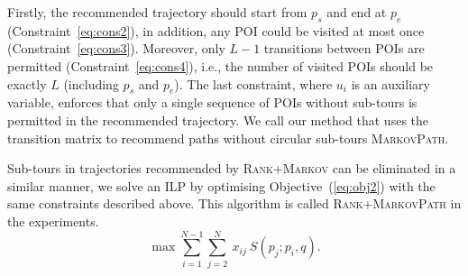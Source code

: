 Firstly, the recommended trajectory should start from $p_s$ and end at $p_e$ (Constraint~\ref{eq:cons2}),
in addition, any POI could be visited at most once (Constraint~\ref{eq:cons3}).
Moreover, only $L-1$ transitions between POIs are permitted (Constraint~\ref{eq:cons4}),
i.e., the number of visited POIs should be exactly $L$ (including $p_s$ and $p_e$).
The last constraint, where $u_i$ is an auxiliary variable, 
enforces that only a single sequence of POIs without sub-tours is permitted in the recommended trajectory.
We call our method that uses the transition matrix to recommend paths 
without circular sub-tours \textsc{MarkovPath}.


Sub-tours in trajectories recommended by \textsc{Rank+Markov} can be eliminated in a similar manner,
we solve an ILP by optimising Objective~(\ref{eq:obj2}) with the same constraints described above.
This algorithm is called \textsc{Rank+MarkovPath} in the experiments.
\vspace{-1.5em}
\begin{equation}
\label{eq:obj2}
\max \sum_{i=1}^{N-1} \sum_{j=2}^N ~x_{ij} ~S(p_j; p_i, q).
\end{equation}




